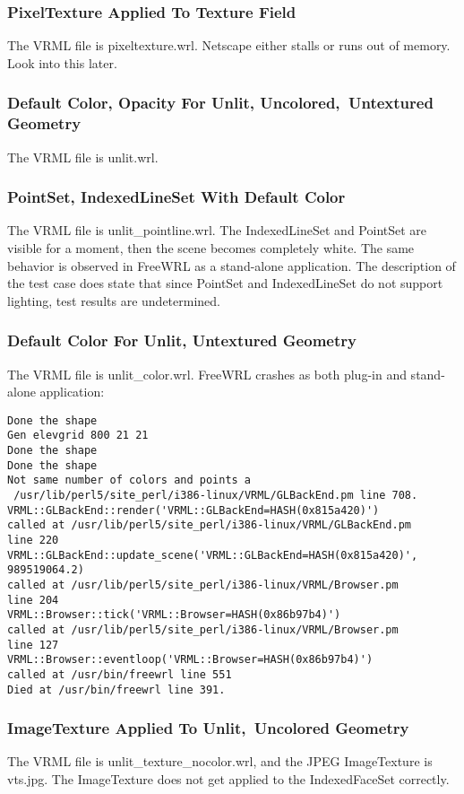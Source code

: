 \documentclass[12pt,letterpaper]{article}
\newcommand{\AppC}{PixelTexture Applied To Texture Field}
\newcommand{\AppDa}{Default Color, Opacity For Unlit, Uncolored,~}
\newcommand{\AppDb}{Untextured Geometry}
\newcommand{\AppE}{PointSet, IndexedLineSet With Default Color}
\newcommand{\AppF}{Default Color For Unlit, Untextured Geometry}
\newcommand{\AppGa}{ImageTexture Applied To Unlit,~}
\newcommand{\AppGb}{Uncolored Geometry}
\begin{document}
\subsubsection{\AppC}
The VRML file is pixeltexture.wrl.\newline
Netscape either stalls or runs out of memory.
Look into this later.

\subsubsection{\AppDa\AppDb}
\label{sec:unlit}
The VRML file is unlit.wrl.

\subsubsection{\AppE}
The VRML file is unlit\_pointline.wrl.\newline
The IndexedLineSet and PointSet are visible for a moment, then the scene becomes completely white. 
The same behavior is observed in FreeWRL as a stand-alone application.\newline
The description of the test case does state that since PointSet and IndexedLineSet do not support
lighting, test results are undetermined.

\subsubsection{\AppF}
The VRML file is unlit\_color.wrl.\newline
FreeWRL crashes as both plug-in and stand-alone application:
\begin{verbatim}
Done the shape
Gen elevgrid 800 21 21
Done the shape
Done the shape
Not same number of colors and points a
 /usr/lib/perl5/site_perl/i386-linux/VRML/GLBackEnd.pm line 708.
VRML::GLBackEnd::render('VRML::GLBackEnd=HASH(0x815a420)')
called at /usr/lib/perl5/site_perl/i386-linux/VRML/GLBackEnd.pm
line 220
VRML::GLBackEnd::update_scene('VRML::GLBackEnd=HASH(0x815a420)',
989519064.2)
called at /usr/lib/perl5/site_perl/i386-linux/VRML/Browser.pm
line 204
VRML::Browser::tick('VRML::Browser=HASH(0x86b97b4)')
called at /usr/lib/perl5/site_perl/i386-linux/VRML/Browser.pm
line 127
VRML::Browser::eventloop('VRML::Browser=HASH(0x86b97b4)')
called at /usr/bin/freewrl line 551
Died at /usr/bin/freewrl line 391.
\end{verbatim}

\subsubsection{\AppGa\AppGb}
\label{sec:unlit-texture-nocolor}
The VRML file is unlit\_texture\_nocolor.wrl, and the JPEG ImageTexture is vts.jpg.\newline
The ImageTexture does not get applied to the IndexedFaceSet correctly.
\end{document}
